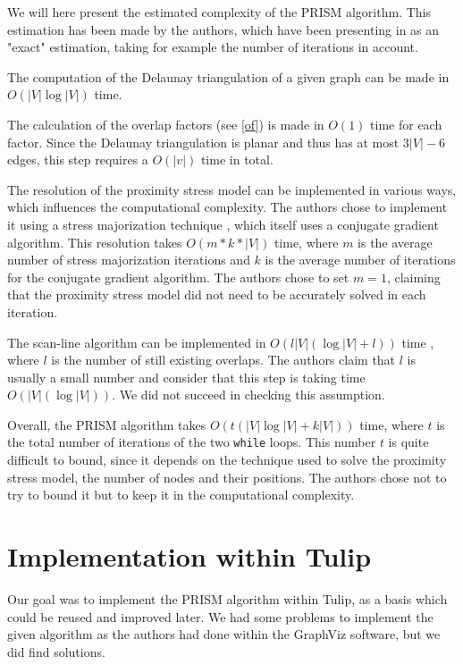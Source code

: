\documentclass[12pt]{report}
\begin{document}
We will here present the estimated complexity of the PRISM algorithm. This estimation has been made by the authors, which have been presenting in as an "exact" estimation, taking for example the number of iterations in account.

The computation of the Delaunay triangulation of a given graph can be made in $O(|V| \log |V|)$ time.

The calculation of the overlap factors (see \ref{of}) is made in $O(1)$ time for each factor. Since the Delaunay triangulation is planar and thus has at most $3|V| -6$ edges, this step requires a $O(|v|)$ time in total.

The resolution of the proximity stress model can be implemented in various ways, which influences the computational complexity. The authors chose to implement it using a stress majorization technique \cite{Gansner05}, which itself uses a conjugate gradient algorithm. This resolution takes $O(m*k*|V|)$ time, where $m$ is the average number of stress majorization iterations and $k$ is the average number of iterations for the conjugate gradient algorithm. The authors chose to set $m =1$, claiming that the proximity stress model did not need to be accurately solved in each iteration.

The scan-line algorithm can be implemented in $O(l |V| (\log |V| + l))$ time \cite{VPSC06}, where $l$ is the number of still existing overlaps. The authors claim that $l$ is usually a small number and consider that this step is taking time $O(|V| (\log |V|))$. We did not succeed in checking this assumption.

Overall, the PRISM algorithm takes $O(t(|V| \log |V| + k|V|))$ time, where $t$ is the total number of iterations of the two \texttt{while} loops. This number $t$ is quite difficult to bound, since it depends on the technique used to solve the proximity stress model, the number of nodes and their positions. The authors chose not to try to bound it but to keep it in the computational complexity.

\chapter{Implementation within Tulip}

Our goal was to implement the PRISM algorithm within Tulip, as a basis which could be reused and improved later. We had some problems to implement the given algorithm as the authors had done within the GraphViz \cite{Gansner02} software, but we did find solutions.
\end{document}
